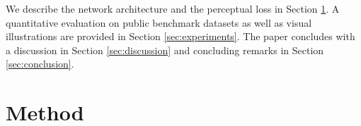 \documentclass[10pt,twocolumn,letterpaper]{article}
\begin{document}

We describe the network architecture and the perceptual loss in Section \ref{sec:method}. A quantitative evaluation on public benchmark datasets as well as visual illustrations are provided in Section \ref{sec:experiments}. The paper concludes with a discussion in Section \ref{sec:discussion} and concluding remarks in Section \ref{sec:conclusion}.

\section{Method}
\label{sec:method}
\end{document}
